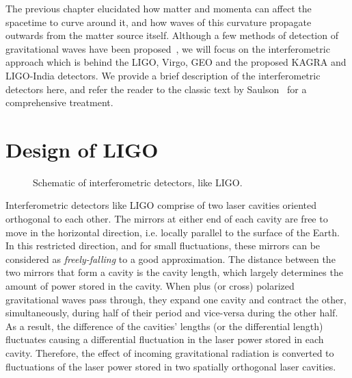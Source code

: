 
The previous chapter elucidated how matter and momenta can affect the spacetime
to curve around it, and how waves of this curvature propagate outwards from 
the matter source itself. Although a few methods of detection of gravitational 
waves have been proposed~\cite{PhysRevLett.20.1307,PhysRevD.54.1264,1978SvA....22...36S,
1979ApJ...234.1100D}, we will focus on the interferometric approach
which is behind the LIGO, Virgo, GEO and the proposed KAGRA
and LIGO-India detectors. We provide a brief description of the interferometric
detectors here, and refer the reader to the classic text by 
Saulson~\cite{Saulson:1995zi} for a comprehensive treatment.

\section{Design of LIGO}\label{sec:ligo_construction}
\begin{figure}
 \begin{center}
 \end{center}
\caption{\label{fig:ligo}Schematic of interferometric detectors, like LIGO.}
\end{figure}
%
Interferometric detectors like LIGO comprise of two laser cavities oriented 
orthogonal to each other. The mirrors at either end of each cavity are free to move 
in the horizontal direction, i.e. locally parallel to the surface of the Earth. 
In this restricted direction, and for small fluctuations, these mirrors can be
considered as {\it freely-falling} to a good approximation.
The distance between the two mirrors that form a cavity is the cavity length,
which largely determines the amount of power stored in the cavity. 
%
When plus (or cross) polarized gravitational waves pass through, they expand 
one cavity and contract the other, simultaneously, during half of their period
and vice-versa during the other half. As a result, the difference of the cavities'
lengths (or the differential length) fluctuates causing a differential fluctuation
in the laser power stored in each cavity. 
% 
Therefore, the effect of incoming gravitational radiation is converted to 
fluctuations of the laser power stored in two spatially orthogonal laser cavities.

